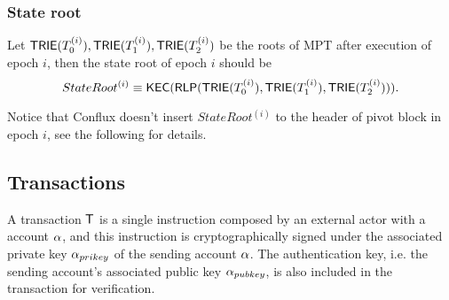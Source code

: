 \subsubsection{State root}

Let $\mathsf{TRIE}(T^{(i)}_0),\mathsf{TRIE}(T^{(i)}_1),\mathsf{TRIE}(T^{(i)}_2)$ be the roots of MPT after execution of epoch $i$, then the state root of epoch $i$ should be 
%
$$ StateRoot^{(i)}\equiv\mathsf{KEC}(\mathsf{RLP}(\mathsf{TRIE}(T^{(i)}_0),\mathsf{TRIE}(T^{(i)}_1),\mathsf{TRIE}(T^{(i)}_2))).$$

Notice that Conflux doesn't insert $StateRoot^{(i)}$ to the header of pivot block in epoch $i$, see the following for details. 


\subsection{Transactions}
\label{sec:tx}

A {\name} transaction $\textsf{T}$ is a single instruction composed by an external actor with a {\name} account $\mathbf{\alpha}$, and this instruction is cryptographically signed under the associated private key $\mathbf{\alpha}_{prikey}$ of the sending account $\mathbf{\alpha}$.
The authentication key, i.e. the sending account's associated public key $\mathbf{\alpha}_{pubkey}$, is also included in the transaction for verification.

